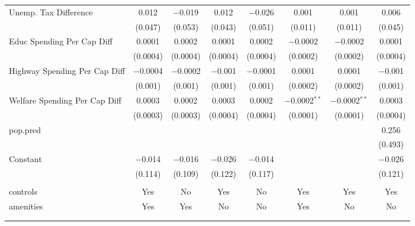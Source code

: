 \begin{table}[!htbp]
\begin{tabular}{@{\extracolsep{5pt}}lccccccc}
  Unemp. Tax Difference & 0.012 & $-$0.019 & 0.012 & $-$0.026 & 0.001 & 0.001 & 0.006 \\ 
  & (0.047) & (0.053) & (0.043) & (0.051) & (0.011) & (0.011) & (0.045) \\ 
  Educ Spending Per Cap Diff & 0.0001 & 0.0002 & 0.0001 & 0.0002 & $-$0.0002 & $-$0.0002 & 0.0001 \\ 
  & (0.0004) & (0.0004) & (0.0004) & (0.0004) & (0.0002) & (0.0002) & (0.0004) \\ 
  Highway Spending Per Cap Diff & $-$0.0004 & $-$0.0002 & $-$0.001 & $-$0.0001 & 0.0001 & 0.0001 & $-$0.001 \\ 
  & (0.001) & (0.001) & (0.001) & (0.001) & (0.0002) & (0.0002) & (0.001) \\ 
  Welfare Spending Per Cap Diff & 0.0003 & 0.0002 & 0.0003 & 0.0002 & $-$0.0002$^{**}$ & $-$0.0002$^{**}$ & 0.0003 \\ 
  & (0.0003) & (0.0003) & (0.0004) & (0.0004) & (0.0001) & (0.0001) & (0.0004) \\ 
  pop.pred &  &  &  &  &  &  & 0.256 \\ 
  &  &  &  &  &  &  & (0.493) \\ 
  Constant & $-$0.014 & $-$0.016 & $-$0.026 & $-$0.014 &  &  & $-$0.026 \\ 
  & (0.114) & (0.109) & (0.122) & (0.117) &  &  & (0.121) \\ 
 \hline \\[-1.8ex] 
controls & Yes & No & Yes & No & Yes & Yes & Yes \\ 
amenities & Yes & Yes & No & No & Yes & No & No \\ 
\hline \\[-1.8ex] 
\hline 
\hline \\[-1.8ex] 
\end{tabular} 
\end{table} 
